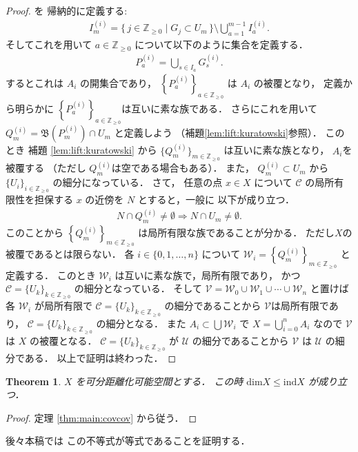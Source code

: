 \documentclass[leqno, a4paper, 12pt]{jsarticle}
\theoremstyle{plain}
\newtheorem{thm}{Theorem}[section]
\theoremstyle{definition}
\theoremstyle{remark}
\newcommand{\To}{\Longrightarrow}
\newcommand{\zz}{\mathbb{Z}}
\newcommand{\yoind}{\mathrm{ind}}
\newcommand{\yodim}{\mathrm{dim}}
\newcommand{\yocovf}[1]{\mathscr{#1}}
\newcommand{\yoliftset}[1]{\mathfrak{B}(#1)}
\numberwithin{equation}{section}
\begin{document}
\begin{proof}
を
帰納的に定義する:
\begin{align}
I_{m}^{(i)}=\{\, j\in\zz_{\ge 0}\mid  G_{j}\subset U_{m}\, \}\setminus \bigcup_{a=1}^{m-1}I_{a}^{(i)}. 
\end{align}
そしてこれを用いて
$a\in \zz_{\ge 0}$
について以下のように集合を定義する．
\begin{align}
P_{a}^{(i)}=\bigcup_{s\in I_a}G_s^{(i)}. 
\end{align}
するとこれは
$A_{i}$
の開集合であり，
$\left\{P_{a}^{(i)}\right\}_{a\in \zz_{\ge 0}}$
は
$A_{i}$
の被覆となり，
定義から明らかに
$\left\{P_{a}^{(i)}\right\}_{a\in \zz_{\ge 0}}$は互いに素な族である．
さらにこれを用いて
$Q_{m}^{(i)}=\yoliftset{P_{m}^{(i)}}\cap U_{m}$
と定義しよう
（補題\ref{lem:lift:kuratowski}参照）．
このとき
補題
\ref{lem:lift:kuratowski}
から
$\{Q_{m}^{(i)}\}_{m\in \zz_{\ge 0}}$
は互いに素な族となり，
$A_{i}$を被覆する
（ただし
$Q_{m}^{(i)}$は空である場合もある）．
また，
$Q_m^{(i)}\subset U_{m}$
から
$\{U_{i}\}_{i\in \zz_{\ge 0}}$
の細分になっている．
さて，
任意の点
$x\in X$
について
$\yocovf{C}$
の局所有限性を担保する
$x$
の近傍を
$N$
とすると，一般に
以下が成り立つ．
\begin{align}
N\cap Q_m^{(i)}\neq\emptyset
\To N\cap U_m\neq\emptyset. 
\end{align}
このことから
$\left\{Q_{m}^{(i)}\right\}_{m\in \zz_{\ge 0}}$
は局所有限な族であることが分かる．
ただし$X$の被覆であるとは限らない．
各
$i\in \{0,1,\dots, n\}$
について
$\yocovf{W}_{i}=\left\{Q_m^{(i)}\right\}_{m\in \zz_{\ge 0}}$
と定義する．
このとき
$\yocovf{W}_{i}$
は互いに素な族で，局所有限であり，
かつ
$\yocovf{C}=\{U_{k}\}_{k\in \zz_{\ge 0}}$
の細分となっている．
そして
$\yocovf{V}=\yocovf{W}_{0}\cup\yocovf{W}_{1}\cup\cdots\cup\yocovf{W}_{n}$
と置けば各
$\yocovf{W}_{i}$
が局所有限で
$\yocovf{C}=\{U_{k}\}_{k\in \zz_{\ge 0}}$
の細分であることから
$\yocovf{V}$は局所有限であり，
$\yocovf{C}=\{U_k\}_{k\in \zz_{\ge 0}}$
の細分となる．
また
$A_{i}\subset \bigcup\yocovf{W}_{i}$
で
$X=\bigcup_{i=0}^{n}A_{i}$
なので
$\yocovf{V}$
は
$X$
の被覆となる．
$\yocovf{C}=\{U_{k}\}_{k\in \zz_{\ge 0}}$
が
$\yocovf{U}$
の細分であることから
$\yocovf{V}$
は
$\yocovf{U}$
の細分である．
以上で証明は終わった．
\end{proof}


\begin{thm}\label{thm:inq:covind}
$X$
を可分距離化可能空間とする．
この時
$\yodim X\le \yoind X$
が成り立つ．
\end{thm}
\begin{proof}
定理
\ref{thm:main:covcov}
から従う．
\end{proof}
後々本稿では
この不等式が等式であることを証明する．
\end{document}
